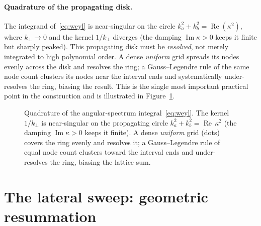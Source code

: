 \documentclass[11pt,a4paper]{article}
\newcommand{\Imm}{\operatorname{Im}}
\newcommand{\Ree}{\operatorname{Re}}
\newcommand{\kperp}{k_{\perp}}
\begin{document}
\paragraph{Quadrature of the propagating disk.} The integrand
of~\eqref{eq:weyl} is near-singular on the circle $k_a^2+k_b^2=\Ree(\kappa^2)$,
where $\kperp\to 0$ and the kernel $1/\kperp$ diverges (the damping
$\Imm\kappa>0$ keeps it finite but sharply peaked). This propagating disk must
be \emph{resolved}, not merely integrated to high polynomial order. A dense
\emph{uniform} grid spreads its nodes evenly across the disk and resolves the
ring; a Gauss--Legendre rule of the same node count clusters its nodes near the
interval ends and systematically under-resolves the ring, biasing the result.
This is the single most important practical point in the construction and is
illustrated in Figure~\ref{fig:disk}.

\begin{figure}[ht]
\centering
{}
\caption{Quadrature of the angular-spectrum integral~\eqref{eq:weyl}. The
  kernel $1/\kperp$ is near-singular on the propagating circle
  $k_a^2+k_b^2=\Ree\,\kappa^2$ (the damping $\Imm\kappa>0$ keeps it finite). A
  dense \emph{uniform} grid (dots) covers the ring evenly and resolves it; a
  Gauss--Legendre rule of equal node count clusters toward the interval ends
  and under-resolves the ring, biasing the lattice sum.}
\label{fig:disk}
\end{figure}

\section{The lateral sweep: geometric resummation}
\label{sec:sweep}
\end{document}
